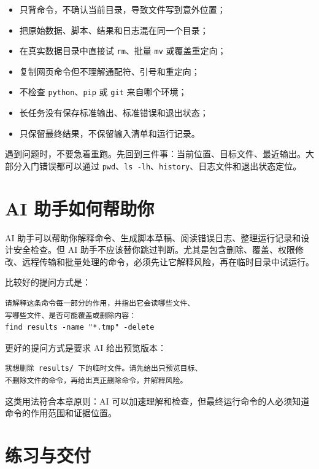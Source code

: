 \begin{warnbox}
\begin{itemize}
    \item 只背命令，不确认当前目录，导致文件写到意外位置；
    \item 把原始数据、脚本、结果和日志混在同一个目录；
    \item 在真实数据目录中直接试 \texttt{rm}、批量 \texttt{mv} 或覆盖重定向；
    \item 复制网页命令但不理解通配符、引号和重定向；
    \item 不检查 \texttt{python}、\texttt{pip} 或 \texttt{git} 来自哪个环境；
    \item 长任务没有保存标准输出、标准错误和退出状态；
    \item 只保留最终结果，不保留输入清单和运行记录。
\end{itemize}
\end{warnbox}

遇到问题时，不要急着重跑。先回到三件事：当前位置、目标文件、最近输出。大部分入门错误都可以通过 \texttt{pwd}、\texttt{ls -lh}、\texttt{history}、日志文件和退出状态定位。

\section{AI 助手如何帮助你}

AI 助手可以帮助你解释命令、生成脚本草稿、阅读错误日志、整理运行记录和设计安全检查。但 AI 助手不应该替你跳过判断。尤其是包含删除、覆盖、权限修改、远程传输和批量处理的命令，必须先让它解释风险，再在临时目录中试运行。

比较好的提问方式是：

\begin{lstlisting}[style=terminal]
请解释这条命令每一部分的作用，并指出它会读哪些文件、
写哪些文件、是否可能覆盖或删除内容：
find results -name "*.tmp" -delete
\end{lstlisting}

更好的提问方式是要求 AI 给出预览版本：

\begin{lstlisting}[style=terminal]
我想删除 results/ 下的临时文件。请先给出只预览目标、
不删除文件的命令，再给出真正删除命令，并解释风险。
\end{lstlisting}

这类用法符合本章原则：AI 可以加速理解和检查，但最终运行命令的人必须知道命令的作用范围和证据位置。

\section{练习与交付}

